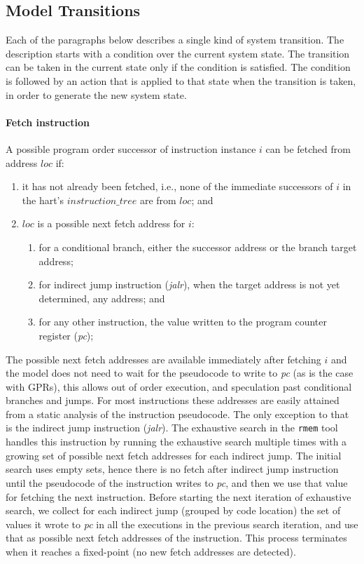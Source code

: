 \subsection{Model Transitions}\label{sec:omm:hart_trans}

Each of the paragraphs below describes a single kind of system transition.
The description starts with a condition over the current system state.
The transition can be taken in the current state only if the condition is satisfied.
The condition is followed by an action that is applied to that state when the transition is taken, in order to generate the new system state.

\paragraph{Fetch instruction}\label{omm:hart:fetch}
A possible program order successor of instruction instance $i$ can be fetched from address $loc$ if:
\begin{enumerate}
\item it has not already been fetched, i.e., none of the immediate successors of $i$ in the hart's $instruction\_tree$ are from $loc$; and
\item $loc$ is a possible next fetch address for $i$:
  \begin{enumerate}
  \item for a conditional branch, either the successor address or the branch target address;
  \item for indirect jump instruction ({\em jalr}), when the target address is not yet determined, any address; and
  \item for any other instruction, the value written to the program counter register ({\em pc});
  \end{enumerate}
\end{enumerate}

\begin{commentary}
The possible next fetch addresses are available immediately after fetching $i$ and the model does not need to wait for the pseudocode to write to {\em pc} (as is the case with GPRs), this allows out of order execution, and speculation past conditional branches and jumps.
For most instructions these addresses are easily attained from a static analysis of the instruction pseudocode.
The only exception to that is the indirect jump instruction ({\em jalr}).
%
The exhaustive search in the {\tt rmem} tool handles this instruction by running the exhaustive search multiple times with a growing set of possible next fetch addresses for each indirect jump.
The initial search uses empty sets, hence there is no fetch after indirect jump instruction until the pseudocode of the instruction writes to {\em pc}, and then we use that value for fetching the next instruction.
Before starting the next iteration of exhaustive search, we collect for each indirect jump (grouped by code location) the set of values it wrote to {\em pc} in all the executions in the previous search iteration, and use that as possible next fetch addresses of the instruction.
This process terminates when it reaches a fixed-point (no new fetch addresses are detected).
\end{commentary}


